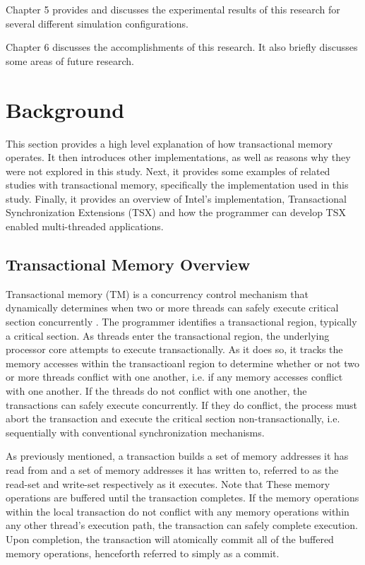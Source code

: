 \documentclass[a4paper]{article}
\begin{document}
\indent
Chapter 5 provides and discusses the experimental results of this research for
several different simulation configurations.
\par

\indent
Chapter 6 discusses the accomplishments of this research.  It also briefly
discusses some areas of future research.
\par

\newpage

\section{\textbf{Background}}

\indent 
This section provides a high level explanation of how transactional
memory operates.  It then introduces other implementations, as well as reasons
why they were not explored in this study.  Next, it provides some examples of
related studies with transactional memory, specifically the implementation used
in this study. Finally, it provides an overview of Intel's implementation,
Transactional Synchronization Extensions (TSX) and how the programmer can
develop TSX enabled multi-threaded applications.
\par

\subsection{\textbf{Transactional Memory Overview}}

\indent
Transactional memory (TM) is a concurrency control mechanism that dynamically
determines when two or more threads can safely execute critical section
concurrently \cite{sle_rajwar}.  The programmer identifies a transactional
region, typically a critical section.  As threads enter the transactional region,
the underlying processor core attempts to execute transactionally. As it does
so, it tracks the memory accesses within the transactioanl region to determine
whether or not two or more threads conflict with one another, i.e. if any memory
accesses conflict with one another.  If the threads do not conflict with one
another, the transactions can safely execute concurrently.  If they do conflict,
the process must abort the transaction and execute the critical section
non-transactionally, i.e.  sequentially with conventional synchronization
mechanisms. 
\par

\indent 
As previously mentioned, a transaction builds a set of memory addresses it has
read from and a set of memory addresses it has written to, referred to as the
read-set and write-set respectively \cite{intel_prog_ref} as it executes.  Note
that These memory operations are buffered until the transaction completes.  If
the  memory operations within the local transaction do not conflict with any
memory operations within any other thread's execution path, the transaction can
safely complete execution.  Upon completion, the transaction will atomically
commit all of the buffered memory operations, henceforth referred to simply as a
commit.
\par
\end{document}
